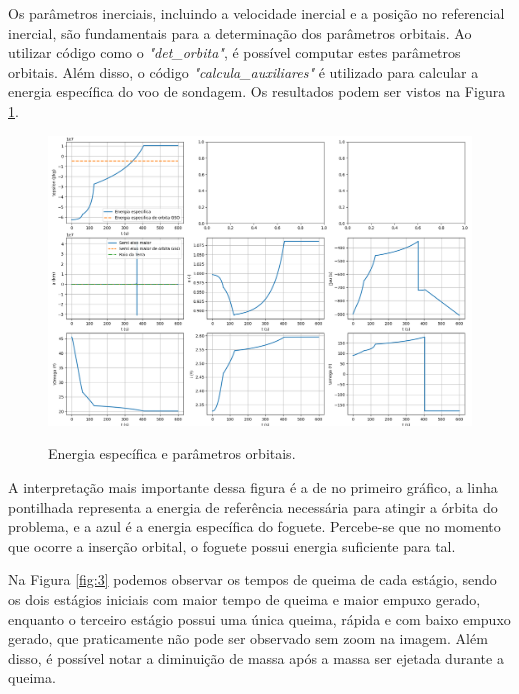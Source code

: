 \newpage

Os parâmetros inerciais, incluindo a velocidade inercial e a posição no referencial inercial, são fundamentais para a determinação dos parâmetros orbitais. Ao utilizar código como o \textit{"det\_orbita"}, é possível computar estes parâmetros orbitais. Além disso, o código \textit{"calcula\_auxiliares"} é utilizado para calcular a energia específica do voo de sondagem. Os resultados podem ser vistos na Figura \ref{fig:energiaespecificasondagem}.


\begin{figure}[H]
    \begin{center}
        \caption{Energia específica e parâmetros orbitais.}
        \includegraphics[width=5.8in]{figuras/energiaespecificasondagem.png}
        \label{fig:energiaespecificasondagem}
     \end{center}
\end{figure}

A interpretação mais importante dessa figura é a de no primeiro gráfico, a linha pontilhada representa a energia de referência necessária para atingir a órbita do problema, e a azul é a energia específica do foguete. Percebe-se que no momento que ocorre a inserção orbital, o foguete possui energia suficiente para tal.

Na Figura \ref{fig:3} podemos observar os tempos de queima de cada estágio, sendo os dois estágios iniciais com maior tempo de queima e maior empuxo gerado, enquanto o terceiro estágio possui uma única queima, rápida e com baixo empuxo gerado, que praticamente não pode ser observado sem zoom na imagem. Além disso, é possível notar a diminuição de massa após a massa ser ejetada durante a queima. 

